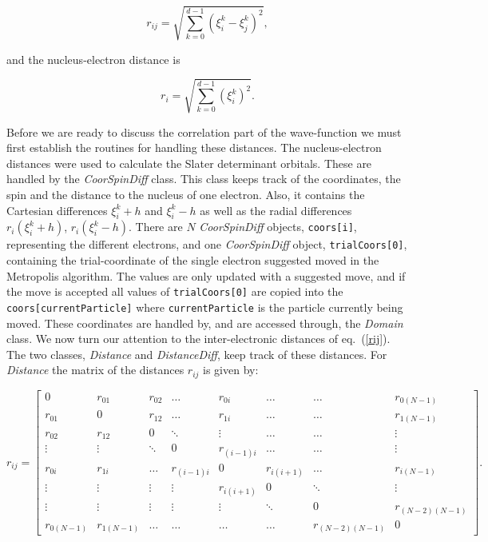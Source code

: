 \begin{equation}
  r_{ij} = \sqrt{
    \sum_{k=0}^{d-1}(\xi_i^k-\xi_j^k)^2},
\label{rij}
\end{equation}

and the nucleus-electron distance is


\begin{equation}
  r_{i} = \sqrt{
    \sum_{k=0}^{d-1}(\xi_i^k)^2}.
\label{ri}
\end{equation}

Before we are ready to discuss the correlation part of the
wave-function we must first establish the
routines for handling these distances. The nucleus-electron distances
were used to calculate the Slater determinant orbitals. These are
handled by the \emph{CoorSpinDiff} class. This
class keeps track of the coordinates, the spin and the distance to the
nucleus of one electron. Also, it contains the Cartesian differences  
$\xi_i^k+h$ and $\xi_i^k-h$ as well as the radial differences
$r_i(\xi_i^k+h)$, $r_i(\xi_i^k-h)$. There are $N$ \emph{CoorSpinDiff}
objects, \lstinline$coors[i]$, representing the different
electrons, and one \emph{CoorSpinDiff} object,
\lstinline$trialCoors[0]$, containing the trial-coordinate of the 
single electron suggested moved in the Metropolis algorithm. The
values are only updated with a suggested move, and if the move is
accepted all values of \lstinline$trialCoors[0]$  are copied into the
\lstinline$coors[currentParticle]$ where \lstinline$currentParticle$
is the particle currently being moved. These coordinates are handled
by, and are accessed through, the \emph{Domain} class.
\newline
%
\newline
We now turn our attention to the inter-electronic distances of
eq.~(\ref{rij}). The two classes, \emph{Distance} and
\emph{DistanceDiff}, keep track of these distances.  
For \emph{Distance} the matrix of the distances
$r_{ij}$ is given by:

\begin{equation}
  r_{ij} = \left[
  \begin{array}{ccccccccc}
    0&r_{01}&r_{02}&\dots & r_{0i} &\dots &\dots & r_{0 (N-1)} \\
    r_{01}&  0   &r_{12}&\dots & r_{1i} &\dots &\dots & r_{1 (N-1)} \\
    r_{02}&  r_{12} &  0   &\ddots& \vdots &\dots &\dots & \vdots       \\
    \vdots&  \vdots & \ddots &0& r_{(i-1)i}&\dots &\dots & \vdots       \\
    r_{0i}&  r_{1i} & \dots  &r_{(i-1)i}&  0&r_{i(i+1)}&\dots & r_{i (N-1)} \\
     \vdots& \vdots & \vdots & \vdots & r_{i(i+1)} &  0    &\ddots     & \vdots \\
     \vdots& \vdots & \vdots & \vdots & \vdots &\ddots & 0 &r_{(N-2) (N-1)} \\
    r_{0(N-1)}&r_{1(N-1)}&\dots&\dots & \dots  & \dots &  r_{(N-2)(N-1)}  &  0
  \end{array} \right].
\label{r_ij}
\end{equation}

